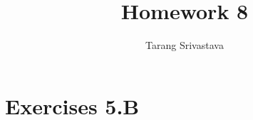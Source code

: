 \documentclass[10pt, twocolumn]{article}
\title{Homework 8}
\author{Tarang Srivastava}
\begin{document}
\makechaptertitle

\section{Exercises 5.B}
\end{document}
